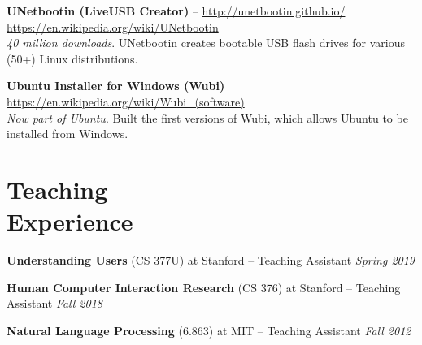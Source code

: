 \documentclass[margin,line]{resume}
\begin{document}
\begin{resume}
\textbf{UNetbootin (LiveUSB Creator)} -- \url{http://unetbootin.github.io/} \hfill \url{https://en.wikipedia.org/wiki/UNetbootin}\\ %
\emph{40 million downloads}. UNetbootin creates bootable USB flash drives for various (50+) Linux distributions. %

\textbf{Ubuntu Installer for Windows (Wubi)} \hfill \url{https://en.wikipedia.org/wiki/Wubi_(software)}\\ %
\emph{Now part of Ubuntu}. Built the first versions of Wubi, which allows Ubuntu to be installed from Windows. %


\section{\mysidestyle Teaching\\Experience}

\textbf{Understanding Users} (CS 377U) at Stanford -- Teaching Assistant \hfill \textsl{Spring 2019} \\

\vspace{-8mm}

\textbf{Human Computer Interaction Research} (CS 376) at Stanford -- Teaching Assistant \hfill \textsl{Fall 2018} \\

\vspace{-8mm}

\textbf{Natural Language Processing} (6.863) at MIT -- Teaching Assistant \hfill \textsl{Fall 2012} \\


\end{resume}
\end{document}
